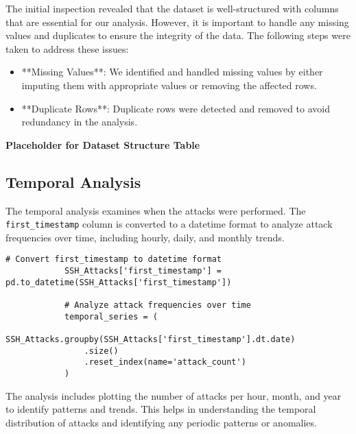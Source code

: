         \vspace{1em}

        The initial inspection revealed that the dataset is well-structured with columns that are essential for our analysis. However, it is important to handle any missing values and duplicates to ensure the integrity of the data. The following steps were taken to address these issues:

        \begin{itemize}
            \item **Missing Values**: We identified and handled missing values by either imputing them with appropriate values or removing the affected rows.
            \item **Duplicate Rows**: Duplicate rows were detected and removed to avoid redundancy in the analysis.
        \end{itemize}

        \textbf{Placeholder for Dataset Structure Table}

    \subsection{Temporal Analysis}
    
        The temporal analysis examines when the attacks were performed. The \texttt{first\_timestamp} column is converted to a datetime format to analyze attack frequencies over time, including hourly, daily, and monthly trends.

        \begin{lstlisting}[caption={Convert timestamps and analyze frequencies}, label={lst:convert-analyze-frequencies}]
            # Convert first_timestamp to datetime format
            SSH_Attacks['first_timestamp'] = pd.to_datetime(SSH_Attacks['first_timestamp'])

            # Analyze attack frequencies over time
            temporal_series = (
                SSH_Attacks.groupby(SSH_Attacks['first_timestamp'].dt.date)
                .size()
                .reset_index(name='attack_count')
            )
        \end{lstlisting}
        
        \vspace{1em}

        The analysis includes plotting the number of attacks per hour, month, and year to identify patterns and trends. This helps in understanding the temporal distribution of attacks and identifying any periodic patterns or anomalies.

